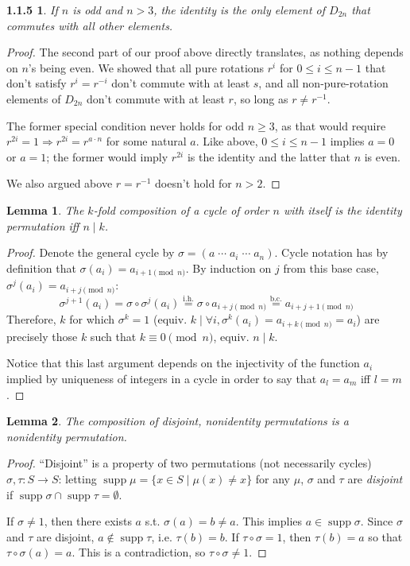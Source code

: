 \documentclass{article}
\DeclareMathOperator{\supp}{supp}
\newtheorem*{1.2.5}{1.1.5}
\newtheorem{lemma}{Lemma}
\begin{document}
\begin{1.2.5}
  If $n$ is odd and $n > 3$, the identity is the only element of $D_{2n}$ that commutes with all other elements.
\end{1.2.5}
\begin{proof}
  The second part of our proof above directly translates, as nothing depends on $n$'s being even.
  We showed that all pure rotations $r^{i}$ for $0\leq i \leq n - 1$ that don't satisfy $r^{i} = r^{-i}$ don't commute with at least $s$,
  and all non-pure-rotation elements of $D_{2n}$ don't commute with at least $r$, so long as $r\neq r^{-1}$.

  The former special condition never holds for odd $n\geq 3$, as that would require $r^{2i}=1\Rightarrow r^{2i}=r^{a\cdot n}$ for some natural $a$.
  Like above, $0\leq i \leq n-1 $ implies $a=0$ or $a=1$; the former would imply $r^{2i}$ is the identity and the latter that $n$ is even.

  We also argued above $r=r^{-1}$ doesn't hold for $n>2$.
\end{proof}

\begin{lemma}
  The $k$-fold composition of a cycle of order $n$ with itself is the identity permutation iff $n\mid k$.
\end{lemma}
\begin{proof}
  Denote the general cycle by $\sigma = (a\;\cdots\; a_{i}\;\cdots\; a_{n})$.
  Cycle notation has by definition that $\sigma(a_{i})=a_{i+1 \pmod n}$.
  By induction on $j$ from this base case, $\sigma^{j}(a_{i})=a_{i+j\pmod n}$:
  \[
    \sigma^{j+1}(a_{i}) = \sigma\circ \sigma^{j}(a_{i})
    \overset{\text{i.h.}}{=} \sigma\circ a_{i+j\pmod n}
    \overset{\text{b.c.}}{=} a_{i+j+1\pmod n}
  \]
  Therefore, $k$ for which $\sigma^{k}=1$ (equiv. $k\mid \forall i,\sigma^{k}(a_{i})=a_{i+k\pmod n}=a_{i}$) are precisely those $k$ such that
  $k\equiv 0\pmod n$, equiv. $n\mid k$.

  Notice that this last argument depends on the injectivity of the function $a_{i}$ implied by uniqueness of integers in a cycle in order to say that
  $a_{l}=a_{m}$ iff $l=m$.
\end{proof}
\begin{lemma}
  The composition of disjoint, nonidentity permutations is a nonidentity permutation.
\end{lemma}
\begin{proof}
  ``Disjoint'' is a property of two permutations (not necessarily cycles) $\sigma,\tau:S\to S$: letting $\supp \mu = \{x\in S\mid \mu(x) \neq x\}$
  for any $\mu$, $\sigma$ and $\tau$ are \textit{disjoint} if $\supp\sigma\cap \supp{\tau}=\emptyset$.

  If $\sigma\neq 1$, then there exists $a$ s.t. $\sigma(a)=b\neq a$.
  This implies $a\in \supp{\sigma}$.
  Since $\sigma$ and $\tau$ are disjoint, $a\not\in \supp{\tau}$, i.e. $\tau(b)=b$.
  If $\tau\circ\sigma=1$, then $\tau(b)=a$ so that $\tau\circ\sigma(a)=a$.
  This is a contradiction, so $\tau\circ\sigma\neq 1$.
\end{proof}
\end{document}
